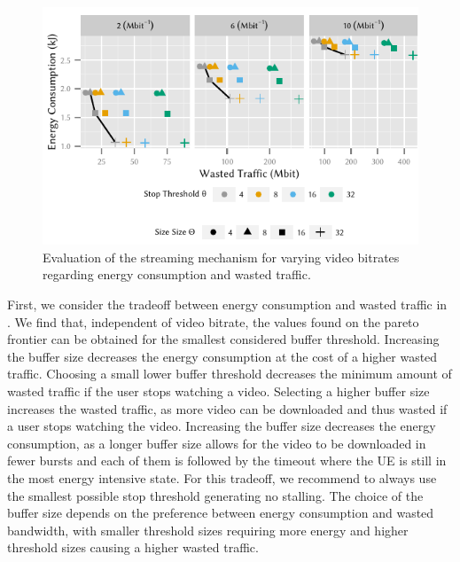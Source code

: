 \begin{figure}
  \centering
  \includegraphics{application/lte_video/trade_offs/figures/energy2lostData}
  \caption{Evaluation of the streaming mechanism for varying video bitrates regarding energy consumption and wasted traffic.}
  \label{fig:application:lte_video:numerical_evaluation:trade_offs:energy2lostData}
\end{figure}


First, we consider the tradeoff between energy consumption and wasted traffic in .
We find that, independent of video bitrate, the values found on the pareto frontier can be obtained for the smallest considered buffer threshold.
Increasing the buffer size decreases the energy consumption at the cost of a higher wasted traffic.
Choosing a small lower buffer threshold \bufferlower decreases the minimum amount of wasted traffic if the user stops watching a video.
Selecting a higher buffer size \buffersize  increases the wasted traffic, as more video can be downloaded and thus wasted if a user stops watching the video.
Increasing the buffer size \buffersize decreases the energy consumption, as a longer buffer size allows for the video to be downloaded in fewer bursts and each of them is followed by the \tidle timeout where the \gls{UE} is still in the most energy intensive \rrcconnected state.
For this tradeoff, we recommend to always use the smallest possible stop threshold generating no stalling.
The choice of the buffer size depends on the preference between energy consumption and wasted bandwidth, with smaller threshold sizes requiring more energy and higher threshold sizes causing a higher wasted traffic.

